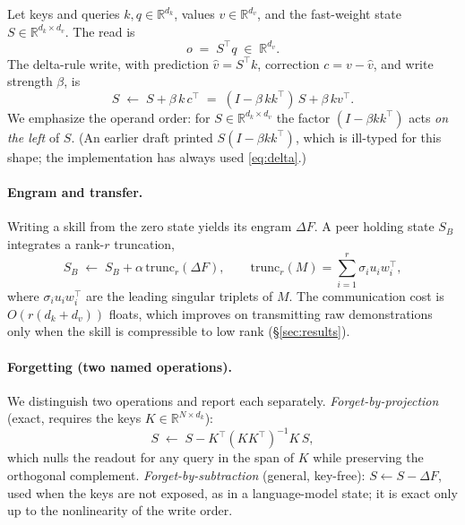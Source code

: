 \documentclass[11pt]{article}
\theoremstyle{definition}
\newcommand{\R}{\mathbb{R}}
\newcommand{\F}{F}
\newcommand{\dk}{d_k}
\newcommand{\dv}{d_v}
\begin{document}
Let keys and queries $k,q\in\R^{\dk}$, values $v\in\R^{\dv}$, and the fast-weight state $S\in\R^{\dk\times\dv}$. The read is
\begin{equation}
o \;=\; S^\top q \;\in\;\R^{\dv}.
\end{equation}
The delta-rule write, with prediction $\hat v = S^\top k$, correction $c = v-\hat v$, and write strength $\beta$, is
\begin{equation}
S \;\leftarrow\; S + \beta\,k\,c^\top
\;=\; (I-\beta\,k k^\top)\,S + \beta\,k v^\top .
\label{eq:delta}
\end{equation}
We emphasize the operand order: for $S\in\R^{\dk\times\dv}$ the factor $(I-\beta kk^\top)$ acts \emph{on the left} of $S$. (An earlier draft printed $S(I-\beta kk^\top)$, which is ill-typed for this shape; the implementation has always used \eqref{eq:delta}.)

\paragraph{Engram and transfer.}
Writing a skill from the zero state yields its engram $\Delta\F$. A peer holding state $S_B$ integrates a rank-$r$ truncation,
\begin{equation}
S_B \;\leftarrow\; S_B + \alpha\,\mathrm{trunc}_r(\Delta\F),
\qquad
\mathrm{trunc}_r(M)=\textstyle\sum_{i=1}^{r}\sigma_i u_i w_i^\top ,
\end{equation}
where $\sigma_i u_i w_i^\top$ are the leading singular triplets of $M$. The communication cost is $O(r(\dk+\dv))$ floats, which improves on transmitting raw demonstrations only when the skill is compressible to low rank (\S\ref{sec:results}).

\paragraph{Forgetting (two named operations).}
We distinguish two operations and report each separately. \emph{Forget-by-projection} (exact, requires the keys $K\in\R^{N\times\dk}$):
\begin{equation}
S \;\leftarrow\; S - K^\top (K K^\top)^{-1} K\,S ,
\label{eq:forget-proj}
\end{equation}
which nulls the readout for any query in the span of $K$ while preserving the orthogonal complement. \emph{Forget-by-subtraction} (general, key-free): $S \leftarrow S - \Delta\F$, used when the keys are not exposed, as in a language-model state; it is exact only up to the nonlinearity of the write order.
\end{document}
